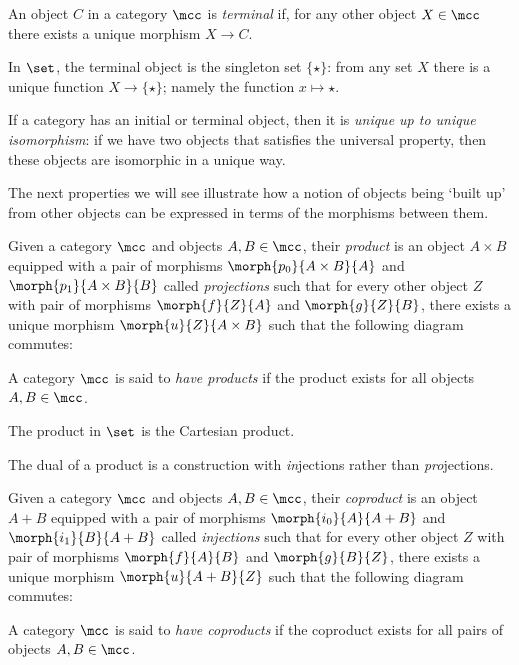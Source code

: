 \begin{definition}
    An object \(C\) in a category \(\mcc\) is \emph{terminal} if, for any other
    object \(X \in \mcc\) there exists a unique morphism \(X \to C\).
\end{definition}

\begin{example}
    In \(\set\), the terminal object is the singleton set \(\{\star\}\):
    from any set \(X\) there is a unique function \(X \to \{\star\}\); namely
    the function \(x \mapsto \star\).
\end{example}

If a category has an initial or terminal object, then it is
\emph{unique up to unique isomorphism}: if we have two objects that
satisfies the universal property, then these objects are isomorphic in a unique
way.

The next properties we will see illustrate how a notion of objects being `built
up' from other objects can be expressed in terms of the morphisms between them.

\begin{definition}[Product]
    Given a category \(\mcc\) and objects \(A,B \in \mcc\), their \emph{product}
    is an object \(A \times B\) equipped with a pair of morphisms
    \(\morph{p_0}{A \times B}{A}\) and \(\morph{p_1}{A \times B}{B}\) called
    \emph{projections} such that for every other object \(Z\) with pair of
    morphisms \(\morph{f}{Z}{A}\) and \(\morph{g}{Z}{B}\), there exists a unique
    morphism \(\morph{u}{Z}{A \times B}\) such that the following diagram
    commutes:
    \begin{center}
        
    \end{center}
    A category \(\mcc\) is said to \emph{have products} if the product exists
    for all objects \(A,B \in \mcc\).
\end{definition}

\begin{example}
    The product in \(\set\) is the Cartesian product.
\end{example}

The dual of a product is a construction with \emph{in}jections rather than
\emph{pro}jections.

\begin{definition}[Coproduct]
    Given a category \(\mcc\) and objects \(A,B \in \mcc\), their \emph{coproduct}
    is an object \(A + B\) equipped with a pair of morphisms
    \(\morph{i_0}{A}{A + B}\) and \(\morph{i_1}{B}{A + B}\) called
    \emph{injections} such that for every other object \(Z\) with pair of
    morphisms \(\morph{f}{A}{B}\) and \(\morph{g}{B}{Z}\), there exists a unique
    morphism \(\morph{u}{A + B}{Z}\) such that the following diagram
    commutes:
    \begin{center}
        
    \end{center}
    A category \(\mcc\) is said to \emph{have coproducts} if the coproduct
    exists for all pairs of objects \(A,B \in \mcc\).
\end{definition}

